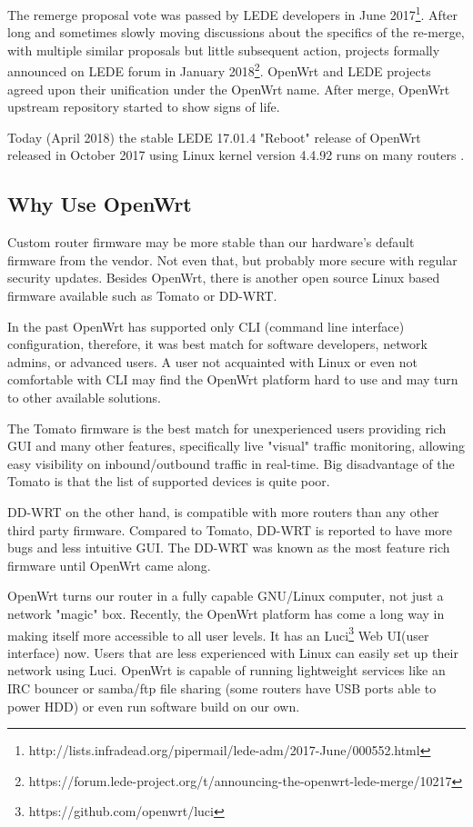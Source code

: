 The remerge proposal vote was passed by LEDE developers in June 2017\footnote{http://lists.infradead.org/pipermail/lede-adm/2017-June/000552.html}.
After long and sometimes slowly moving discussions about the specifics of the re-merge, with multiple similar proposals but little subsequent action, projects formally announced on LEDE forum in January 2018\footnote{https://forum.lede-project.org/t/announcing-the-openwrt-lede-merge/10217}.
OpenWrt and LEDE projects agreed upon their unification under the OpenWrt name.
After merge, OpenWrt upstream repository started to show signs of life.

Today (April 2018) the stable LEDE 17.01.4 "Reboot" release of OpenWrt released in October 2017 using Linux kernel version 4.4.92 runs on many routers \cite{lede_release}.



\subsection{Why Use OpenWrt}

Custom router firmware may be more stable than our hardware’s default firmware from the vendor.
Not even that, but probably more secure with regular security updates.
Besides OpenWrt, there is another open source Linux based firmware available such as Tomato or DD-WRT.

In the past OpenWrt has supported only CLI (command line interface) configuration, therefore, it was best match for software developers, network admins, or advanced users.
A user not acquainted with Linux or even not comfortable with CLI may find the OpenWrt platform hard to use and may turn to other available solutions.

The Tomato firmware is the best match for unexperienced users providing rich GUI and many other features, specifically live "visual" traffic monitoring, allowing easy visibility on inbound/outbound traffic in real-time.
Big disadvantage of the Tomato is that the list of supported devices is quite poor.

DD-WRT on the other hand, is compatible with more routers than any other third party firmware.
Compared to Tomato, DD-WRT is reported to have more bugs and less intuitive GUI.
The DD-WRT was known as the most feature rich firmware until OpenWrt came along.

OpenWrt turns our router in a fully capable GNU/Linux computer, not just a network "magic" box.
Recently, the OpenWrt platform has come a long way in making itself more accessible to all user levels.
It has an Luci\footnote{https://github.com/openwrt/luci} Web UI(user interface) now.
Users that are less experienced with Linux can easily set up their network using Luci.
OpenWrt is capable of running lightweight services like an IRC bouncer or samba/ftp file sharing (some routers have USB ports able to power HDD) or even run software build on our own\cite{vpnpick}.

